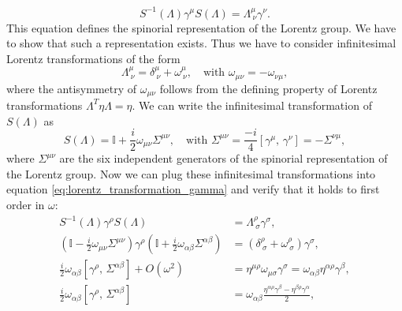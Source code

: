 \begin{equation}
    S^{-1}(\Lambda) \gamma^{\mu} S(\Lambda) = \Lambda^{\mu}_{\ \nu} \gamma^{\nu}.
    \label{eq:lorentz_transformation_gamma}
\end{equation}
This equation defines the spinorial representation of the Lorentz group. We have to show that such a representation exists. Thus we have to consider infinitesimal Lorentz transformations of the form
\[
    \Lambda^{\mu}_{\ \nu} = \delta^{\mu}_{\ \nu} + \omega^{\mu}_{\ \nu}, \quad \text{with } \omega_{\mu \nu} = - \omega_{\nu \mu},
\]
where the antisymmetry of \(\omega_{\mu \nu}\) follows from the defining property of Lorentz transformations \(\Lambda^T \eta \Lambda = \eta\). We can write the infinitesimal transformation of \(S(\Lambda)\) as
\[
    S(\Lambda) = \mathbb{I} + \frac{i}{2} \omega_{\mu \nu} \Sigma^{\mu \nu}, \quad \text{with } \Sigma^{\mu \nu} = \frac{-i}{4} [\gamma^{\mu},\, \gamma^{\nu}] = -\Sigma^{\nu \mu},
\]
where \(\Sigma^{\mu \nu}\) are the six independent generators of the spinorial representation of the Lorentz group. Now we can plug these infinitesimal transformations into equation \eqref{eq:lorentz_transformation_gamma} and verify that it holds to first order in \(\omega\):
\[
    \begin{aligned}
        S^{-1}(\Lambda) \gamma^{\rho} S(\Lambda)                                                                                                                                & = \Lambda^{\rho}_{\ \sigma} \gamma^{\sigma},                                                                     \\
        \left(\mathbb{I} - \frac{i}{2} \omega_{\mu \nu} \Sigma^{\mu \nu}\right) \gamma^{\rho} \left(\mathbb{I} + \frac{i}{2} \omega_{\alpha \beta} \Sigma^{\alpha \beta}\right) & = \left(\delta^{\rho}_{\ \sigma} + \omega^{\rho}_{\ \sigma} \right) \gamma^{\sigma},                             \\
        \frac{i}{2} \omega_{\alpha \beta} [\gamma^{\rho},\, \Sigma^{\alpha \beta}] + O(\omega^2)                                                                                & = \eta^{\mu \rho} \omega_{\mu \sigma} \gamma^{\sigma} = \omega_{\alpha \beta} \eta^{\alpha \rho} \gamma^{\beta}, \\
        \frac{i}{2} \omega _{\alpha \beta}[\gamma^{\rho},\, \Sigma^{\alpha \beta}]                                                                                              & = \omega_{\alpha \beta} \frac{\eta^{\alpha \rho} \gamma^{\beta} - \eta^{\beta \rho} \gamma^{\alpha}}{2},
    \end{aligned}
\]
